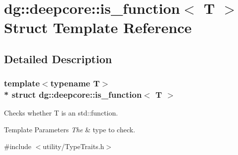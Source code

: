 \hypertarget{structdg_1_1deepcore_1_1is__function}{}\section{dg\+:\+:deepcore\+:\+:is\+\_\+function$<$ T $>$ Struct Template Reference}
\label{structdg_1_1deepcore_1_1is__function}


\subsection{Detailed Description}
\subsubsection*{template$<$typename T$>$\\*
struct dg\+::deepcore\+::is\+\_\+function$<$ T $>$}

Checks whether T is an {\ttfamily std\+::function}. 


\begin{DoxyTemplParams}{Template Parameters}
{\em The} & type to check. \\
\hline
\end{DoxyTemplParams}


{\ttfamily \#include $<$utility/\+Type\+Traits.\+h$>$}

